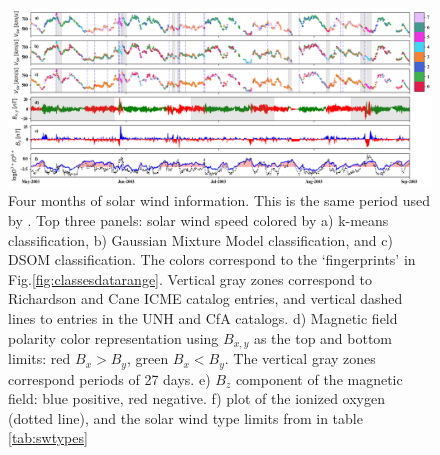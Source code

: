 \documentclass[utf8]{frontiersSCNS} %
\begin{document}
\begin{figure}[h!]
	\begin{center}
		\includegraphics[width=18cm]{timeseries}%
	\end{center}
	\caption{Four months of solar wind information. This is the same period used by \citep{Roberts2020}. Top three panels: solar wind speed colored by a) k-means classification, b) Gaussian Mixture Model classification, and c) DSOM classification. The colors correspond to the `fingerprints' in Fig.\ref{fig:classesdatarange}. Vertical gray zones correspond to Richardson and Cane ICME catalog entries, and vertical dashed lines to entries in the UNH and CfA catalogs. d) Magnetic field polarity color representation using $B_{x,y}$ as the top and bottom limits: red $B_x>B_y$, green $B_x<B_y$. The vertical gray zones correspond periods of 27 days. e) $B_z$ component of the magnetic field: blue positive, red negative. f) plot of the ionized oxygen (dotted line), and the solar wind type limits from \citep{Zhao2009} in table \ref{tab:swtypes}}\label{fig:timeseries}
\end{figure}

\end{document}
